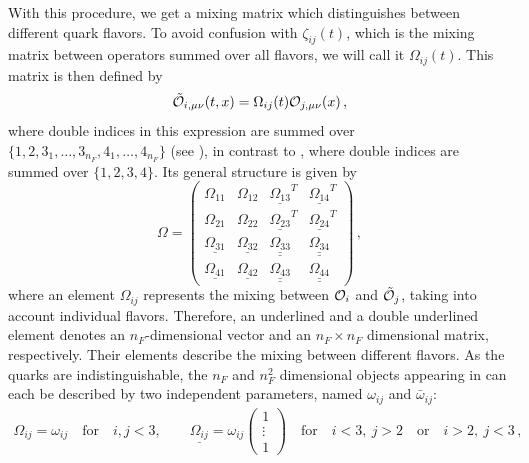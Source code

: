 With this procedure, we get a mixing matrix which distinguishes between
different quark flavors. To avoid confusion with $\zeta_{ij} (t)$, which
is the mixing matrix between operators summed over all flavors, we will
call it $\Omega_{ij} (t)$. This matrix is then defined by
\begin{equation}
	\tilde{\mathcal{O}}_{i, \mu \nu} (t, x) = \Omega_{i j} (t) \mathcal{O}_{j, \mu \nu} (x) \, ,
\end{equation}
where double indices in this expression are summed over $\{1, 2,
3_1,\ldots, 3_{n_F}, 4_1,\ldots,4_{n_F}\}$ (see ), in
contrast to , where double indices are summed over $\{1,
2, 3, 4\}$. Its general structure is given by
\begin{equation}
	\Omega =
	\begin{pmatrix}
		\Omega_{1 1} & \Omega_{1 2} & \underline{\Omega_{1 3}}^T & \underline{\Omega_{1 4}}^T \\
		\Omega_{2 1} & \Omega_{2 2} & \underline{\Omega_{2 3}}^T & \underline{\Omega_{2 4}}^T \\
		\underline{\Omega_{3 1}} & \underline{\Omega_{3 2}} & \underline{\underline{\Omega_{3 3}}} & \underline{\underline{\Omega_{3 4}}} \\
		\underline{\Omega_{4 1}} & \underline{\Omega_{4 2}} & \underline{\underline{\Omega_{4 3}}} & \underline{\underline{\Omega_{4 4}}}
	\end{pmatrix} \, ,
	\label{eq:Omega}
\end{equation}
where an element $\Omega_{i j}$ represents the mixing between $\mathcal{O}_i$
and $\tilde{\mathcal{O}}_j$, taking into account individual flavors. Therefore, an
underlined and a double underlined element denotes an $n_F$-dimensional
vector and an $n_F \times n_F$ dimensional matrix, respectively.  Their
elements describe the mixing between different flavors.  As the quarks
are indistinguishable, the $n_F$ and $n_F^2$ dimensional objects
appearing in  can each be described by two independent
parameters, named $\omega_{ij}$ and $\bar{\omega}_{ij}$:
\begin{equation*}
	\begin{split}
		\Omega_{i j} = \omega_{i j} \quad \text{for} \quad i,j <
                3, \qquad
		\underline{\Omega_{i j}} = \omega_{i j}
		\begin{pmatrix}
			1 \\
			\vdots \\
			1
		\end{pmatrix} \quad \text{for} \quad i < 3,\
                j > 2 \quad \text{or} \quad i > 2,\ j < 3\,,
	\end{split}
\end{equation*}
